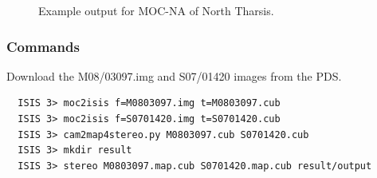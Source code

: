 \begin{figure}[h!]
\centering
  \hfil
\caption{Example output for MOC-NA of North Tharsis.}
\label{fig:mocna_n_tharsis_example}
\end{figure}

\subsubsection*{Commands}

Download the M08/03097.img and S07/01420 images from the \ac{PDS}.
\begin{verbatim}
  ISIS 3> moc2isis f=M0803097.img t=M0803097.cub
  ISIS 3> moc2isis f=S0701420.img t=S0701420.cub
  ISIS 3> cam2map4stereo.py M0803097.cub S0701420.cub
  ISIS 3> mkdir result
  ISIS 3> stereo M0803097.map.cub S0701420.map.cub result/output
\end{verbatim}

